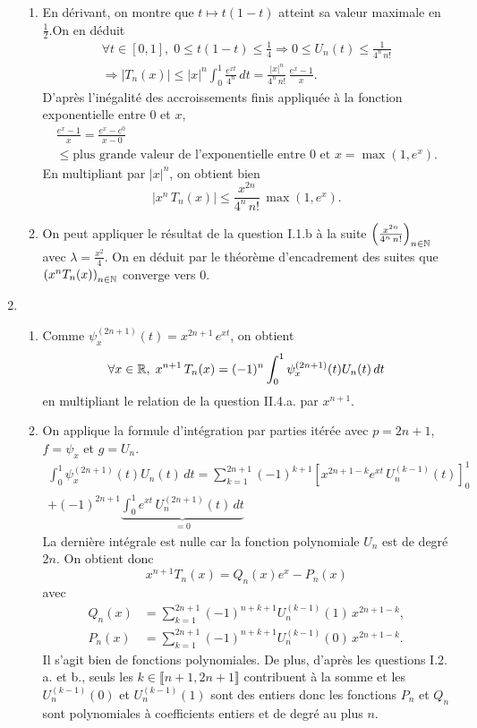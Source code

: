 \begin{enumerate}
\begin{enumerate}
    \item En dérivant, on montre que $t\mapsto t(1-t)$ atteint sa valeur maximale en $\frac{1}{2}$.\newline On en déduit
\begin{multline*}
\forall t \in \left[ 0,1 \right], \; 0 \leq t(1-t) \leq \frac{1}{4} \Rightarrow 0\leq U_n(t) \leq \frac{1}{4^n\, n!}\\
\Rightarrow
|T_n(x)| \leq |x|^n \int_0^{1} \frac{e^{xt}}{4^{n}}\,dt
 = \frac{|x|^n}{4^n\, n!}\,\frac{e^x -1}{x}.
\end{multline*}
D'après l'inégalité des accroissements finis appliquée à la fonction exponentielle entre $0$ et $x$, 
\begin{multline*}
\frac{e^x -1}{x} = \frac{e^x - e^0}{x - 0} \\
\leq \text{plus grande valeur de l'exponentielle entre $0$ et $x$} 
= \max(1,e^x).
\end{multline*}
En multipliant par $|x|^n$, on obtient bien
\[
 \left|x^n\, T_n(x) \right| \leq \frac{x^{2n}}{4^n\, n!}\, \max(1,e^{x}).
\]
    \item On peut appliquer le résultat de la question I.1.b à la suite $\left( \frac{x^{2n}}{4^n\, n!} \right)_{n \in \mathbb{N}}$ avec $\lambda = \frac{x^2}{4}$. On en déduit par le théorème d'encadrement des suites que $\left( x^n T_n(x) \right)_{n \in \mathbb{N}}$ converge vers $0$.
 \end{enumerate}

 \item
  \begin{enumerate}
    \item Comme $\psi_x^{(2n+1)}(t) = x^{2n+1}\, e^{xt}$, on obtient 
\[
 \forall x \in \mathbb{R}, \; x^{n+1}\,T_n(x) = (-1)^n \int_0^1\psi_x^{(2n+1)}(t) U_n(t)\,dt
\]
en multipliant le relation de la question II.4.a. par $x^{n+1}$.
    \item On applique la formule d'intégration par parties itérée avec $p=2n+1$, $f= \psi_x$ et $g = U_n$.
\begin{multline*}
 \int_0^1\psi_x^{(2n+1)}(t) U_n(t)\,dt  = \sum_{k=1}^{2n+1}(-1)^{k+1}\left[ x^{2n+1-k}e^{xt}\,U_n^{(k-1)}(t)\right]_0^1 \\
                  + (-1)^{2n+1}\underset{=0}{\underbrace{\int_0^1 e^{xt} \, U_n^{(2n+1)}(t)\,dt}} 
\end{multline*}
La dernière intégrale est nulle car la fonction polynomiale $U_n$ est de degré $2n$.
On obtient donc
\[
 x^{n+1}T_n(x) = Q_n(x)e^{x} - P_n(x)
\]
avec
\begin{align*}
 Q_n(x) &= \sum_{k=1}^{2n+1}(-1)^{n+k+1}U_{n}^{(k-1)}(1)\,x^{2n+1-k},\\
 P_n(x) &= \sum_{k=1}^{2n+1}(-1)^{n+k+1}U_{n}^{(k-1)}(0)\,x^{2n+1-k}.
\end{align*}
Il s'agit bien de fonctions polynomiales. De plus, d'après les questions I.2. a. et b., seuls les $k\in \llbracket n+1, 2n+1 \rrbracket$ contribuent à la somme et les $U_{n}^{(k-1)}(0)$ et $U_{n}^{(k-1)}(1)$ sont des entiers donc les fonctions $P_n$ et $Q_n$ sont polynomiales à coefficients entiers et de degré au plus $n$.


\end{enumerate}
\end{enumerate}
